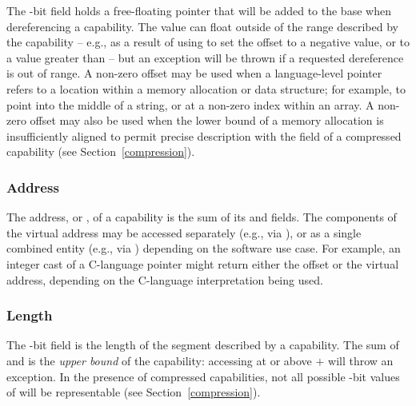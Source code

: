 The \xlen{}-bit \coffset{} field holds a free-floating pointer that will be
added to the base when dereferencing a capability.
The value can float outside of the range described by the capability -- e.g.,
as a result of using  to set the offset to a negative
value, or to a value greater than \clength{} -- but an exception will be
thrown if a requested dereference is out of range.
A non-zero offset may be used when a language-level pointer refers to a
location within a memory allocation or data structure; for example, to point
into the middle of a string, or at a non-zero index within an array.
A non-zero offset may also be used when the lower bound of a memory allocation
is insufficiently aligned to permit precise description with the \cbase{}
field of a compressed capability (see Section~\ref{compression}).

\subsubsection{Address}

The address, or \ccursor{}, of a capability is the sum of its
\cbase{} and \coffset{} fields.
The components of the virtual address may be accessed separately (e.g., via
), or as a single combined entity (e.g., via
) depending on the software
use case.
For example, an integer cast of a C-language pointer might return either the
offset or the virtual address, depending on the C-language interpretation
being used.


\subsubsection{Length}

The \xlen{}-bit \clength{} field is the length of the segment described by a
capability.
The sum of \cbase{} and \clength{} is the \textit{upper bound} of the
capability: accessing at or above \cbase{} $+$ \clength{} will throw an
exception.
In the presence of compressed capabilities, not all possible \xlen{}-bit
values of \clength{} will be representable (see Section~\ref{compression}).

